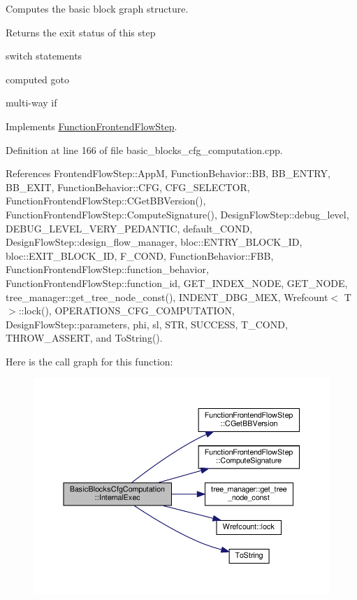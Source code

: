 Computes the basic block graph structure. 

\begin{DoxyReturn}{Returns}
the exit status of this step 
\end{DoxyReturn}
switch statements

computed goto

multi-\/way if 

Implements \hyperlink{classFunctionFrontendFlowStep_a00612f7fb9eabbbc8ee7e39d34e5ac68}{Function\+Frontend\+Flow\+Step}.



Definition at line 166 of file basic\+\_\+blocks\+\_\+cfg\+\_\+computation.\+cpp.



References Frontend\+Flow\+Step\+::\+AppM, Function\+Behavior\+::\+BB, B\+B\+\_\+\+E\+N\+T\+RY, B\+B\+\_\+\+E\+X\+IT, Function\+Behavior\+::\+C\+FG, C\+F\+G\+\_\+\+S\+E\+L\+E\+C\+T\+OR, Function\+Frontend\+Flow\+Step\+::\+C\+Get\+B\+B\+Version(), Function\+Frontend\+Flow\+Step\+::\+Compute\+Signature(), Design\+Flow\+Step\+::debug\+\_\+level, D\+E\+B\+U\+G\+\_\+\+L\+E\+V\+E\+L\+\_\+\+V\+E\+R\+Y\+\_\+\+P\+E\+D\+A\+N\+T\+IC, default\+\_\+\+C\+O\+ND, Design\+Flow\+Step\+::design\+\_\+flow\+\_\+manager, bloc\+::\+E\+N\+T\+R\+Y\+\_\+\+B\+L\+O\+C\+K\+\_\+\+ID, bloc\+::\+E\+X\+I\+T\+\_\+\+B\+L\+O\+C\+K\+\_\+\+ID, F\+\_\+\+C\+O\+ND, Function\+Behavior\+::\+F\+BB, Function\+Frontend\+Flow\+Step\+::function\+\_\+behavior, Function\+Frontend\+Flow\+Step\+::function\+\_\+id, G\+E\+T\+\_\+\+I\+N\+D\+E\+X\+\_\+\+N\+O\+DE, G\+E\+T\+\_\+\+N\+O\+DE, tree\+\_\+manager\+::get\+\_\+tree\+\_\+node\+\_\+const(), I\+N\+D\+E\+N\+T\+\_\+\+D\+B\+G\+\_\+\+M\+EX, Wrefcount$<$ T $>$\+::lock(), O\+P\+E\+R\+A\+T\+I\+O\+N\+S\+\_\+\+C\+F\+G\+\_\+\+C\+O\+M\+P\+U\+T\+A\+T\+I\+ON, Design\+Flow\+Step\+::parameters, phi, sl, S\+TR, S\+U\+C\+C\+E\+SS, T\+\_\+\+C\+O\+ND, T\+H\+R\+O\+W\+\_\+\+A\+S\+S\+E\+RT, and To\+String().

Here is the call graph for this function\+:
\nopagebreak
\begin{figure}[H]
\begin{center}
\leavevmode
\includegraphics[width=350pt]{d5/d4c/classBasicBlocksCfgComputation_a466edbf43995a1c596d1c9f63e61e7df_cgraph}
\end{center}
\end{figure}


